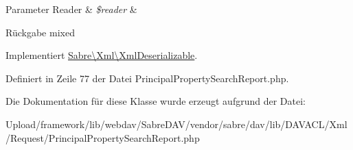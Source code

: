 \begin{DoxyParams}[1]{Parameter}
Reader & {\em \$reader} & \\
\hline
\end{DoxyParams}
\begin{DoxyReturn}{Rückgabe}
mixed 
\end{DoxyReturn}


Implementiert \mbox{\hyperlink{interface_sabre_1_1_xml_1_1_xml_deserializable_a19e0eca545b9a0d93f7d6b69085ade30}{Sabre\textbackslash{}\+Xml\textbackslash{}\+Xml\+Deserializable}}.



Definiert in Zeile 77 der Datei Principal\+Property\+Search\+Report.\+php.



Die Dokumentation für diese Klasse wurde erzeugt aufgrund der Datei\+:\begin{DoxyCompactItemize}
\item 
Upload/framework/lib/webdav/\+Sabre\+D\+A\+V/vendor/sabre/dav/lib/\+D\+A\+V\+A\+C\+L/\+Xml/\+Request/Principal\+Property\+Search\+Report.\+php\end{DoxyCompactItemize}
